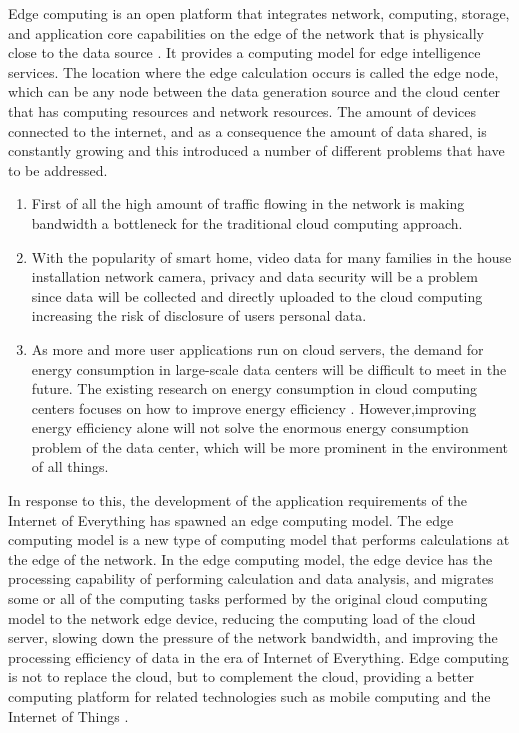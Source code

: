 Edge computing \cite{Edge} is an open platform that integrates network, computing, storage, and application core
capabilities on the edge of the network that is physically close to the data source \cite{Edge2}. It provides
a computing model for edge intelligence services. The location where the edge calculation occurs is 
called the edge node, which can be any node between the data generation source and the cloud center
that has computing resources and network resources. The amount of devices connected to the 
internet, and as a consequence the amount of data shared, is constantly \cite{DataGrowth} growing and this introduced 
a number of different problems that have to be addressed. 
\\
\begin{enumerate}
    \item First of all the high amount of traffic flowing in the network is making bandwidth a
            bottleneck for the traditional cloud computing approach. 

    \item With the popularity of smart home, video data for many families in the house installation
            network camera, privacy and data security will be a problem since data will be collected
            and directly uploaded to the cloud computing increasing the risk of disclosure of users 
            personal data.

    \item As more and more user applications run on cloud servers, the demand for energy consumption
            in large-scale data centers will be difficult to meet in the future. The existing research on
            energy consumption in cloud computing centers focuses on how to improve energy efficiency \cite{EnEff}.
            However,improving energy efficiency alone will not solve the enormous energy consumption 
            problem of the data center, which will be more prominent in the environment of all things.
\end{enumerate}

In response to this, the development of the application requirements of the Internet of Everything has 
spawned an edge computing model. The edge computing model is a new type of computing model that performs
calculations at the edge of the network. In the edge computing model, the edge device has the processing
capability of performing calculation and data analysis, and migrates some or all of the computing tasks
performed by the original cloud computing model to the network edge device, reducing the computing load
of the cloud server, slowing down the pressure of the network bandwidth, and improving the processing 
efficiency of data in the era of Internet of Everything. Edge computing is not to replace the cloud, 
but to complement the cloud, providing a better computing platform for related technologies such as mobile
computing and the Internet of Things \cite{IoT}.

